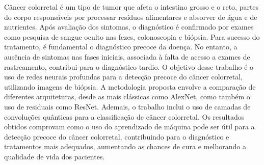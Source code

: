 Câncer colorretal é um tipo de tumor que afeta o intestino grosso e o reto, partes do corpo responsáveis por processar resíduos alimentares e absorver de água e de nutrientes. Após avaliação dos sintomas, o diagnóstico é confirmado por exames como pesquisa de sangue oculto nas fezes, colonoscopia e biópsia. Para sucesso do tratamento, é fundamental o diagnóstico precoce da doença. No entanto, a ausência de sintomas nas fases iniciais, associada à falta de acesso a exames de rastreamento, contribui para o diagnóstico tardio.
O objetivo desse trabalho é o uso de redes neurais profundas para a detecção precoce do câncer colorretal, utilizando imagens de biópsia. A metodologia proposta envolve a comparação de diferentes arquiteturas, desde as mais clássicas como AlexNet, como também o uso de residuais como ResNet. Ademais, o trabalho inclui o uso de camadas de convoluções quânticas para a classificação de câncer colorretal.
Os resultados obtidos comprovam como o uso do aprendizado de máquina pode ser útil para a detecção precoce do câncer colorretal, contribuindo para o diagnóstico e tratamentos mais adequados, aumentando as chances de cura e melhorando a qualidade de vida dos pacientes.